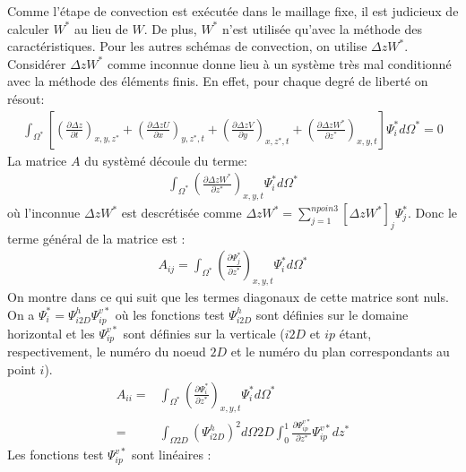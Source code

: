 Comme l'étape de convection est exécutée dans le maillage fixe, il est judicieux de calculer $W^*$ au lieu de $W$. De plus, $W^*$ n'est utilisée qu'avec la méthode des caractéristiques. Pour les autres schémas de convection, on utilise $ \Delta z W^*$.\\ 
Considérer $ \Delta z W^*$ comme inconnue donne lieu à un système très mal conditionné avec la méthode des éléments finis. En effet, pour chaque degré de liberté on résout:
\begin{align*}
\int_{\Omega^*} \left[ \left(\frac{\partial\Delta z}{\partial t}\right)_{x,y,z^*} +
	\left(\frac{\partial\Delta zU}{\partial x}\right)_{y,z^*,t} +
	\left(\frac{\partial\Delta zV}{\partial y}\right)_{x,z^*,t} +
	\left(\frac{\partial\Delta zW^*}{\partial z^*}\right)_{x,y,t}\right] \Psi_i^* d \Omega^* = 0
\end{align*}
La matrice $A$ du systèmé découle du terme:
\begin{align*}
\int_{\Omega^*} \left(\frac{\partial\Delta zW^*}{\partial z^*}\right)_{x,y,t}\Psi_i^* d \Omega^* 
\end{align*}
où l'inconnue $ \Delta z W^*$ est descrétisée comme $ \Delta z W^* = \sum\limits_{j=1}^{npoin3}[\Delta z W^*]_j \Psi^*_j$.
Donc le terme général de la matrice est :
\begin{align*}
 A_{ij} = \int_{\Omega^*} \left(\frac{\partial \Psi_j^*}{\partial z^*}\right)_{x,y,t}\Psi_i^* d \Omega^* 
\end{align*}
On montre dans ce qui suit que les termes diagonaux de cette matrice sont nuls.\\
On a $\Psi_i^* = \Psi_{i2D}^h \Psi_{ip}^{v*} $ où les fonctions test $\Psi_{i2D}^h$ sont définies sur le domaine horizontal et les $\Psi_{ip}^{v*}$ sont définies sur la verticale ($i2D$ et $ip$ étant, respectivement, le numéro du noeud $2D$ et le numéro du plan correspondants au point $i$).
\begin{align*}
 A_{ii} =& \int_{\Omega^*} \left(\frac{\partial \Psi_i^*}{\partial z^*}\right)_{x,y,t}\Psi_i^* d \Omega^*\\
 =& \int_{\Omega 2D} (\Psi_{i2D}^h)^2 d \Omega 2D \int_0^1 \frac{\partial \Psi_{ip}^{v*}}{\partial z^* } \Psi_{ip}^{v*} d z^*
\end{align*}
Les fonctions test $\Psi_{ip}^{v*}$ sont linéaires :
